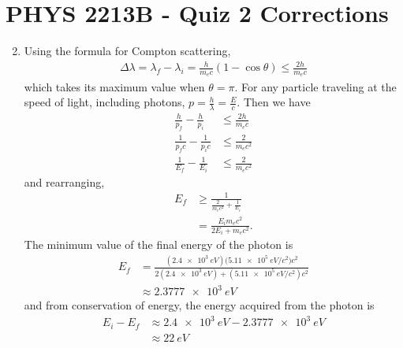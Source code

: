 \documentclass[a4paper,12pt]{article}
\begin{document}
\section*{PHYS 2213B - Quiz 2 Corrections}

\begin{enumerate}
    \setcounter{enumi}{1}
    \item
        Using the formula for Compton scattering,
        \begin{align*}
            \Delta \lambda = \lambda_f - \lambda_i = \frac{h}{m_e c}(1 - \cos\theta) \leq \frac{2h}{m_e c}
        \end{align*}
        which takes its maximum value when $\theta = \pi$. For any particle traveling at the speed of light, including photons, $p = \frac{h}{\lambda} = \frac{E}{c}$. Then we have
        \begin{align*}
            \frac{h}{p_f} - \frac{h}{p_i} &\leq \frac{2h}{m_e c} \\
            \frac{1}{p_f c} - \frac{1}{p_i c} &\leq \frac{2}{m_e c^2} \\
            \frac{1}{E_f} - \frac{1}{E_i} &\leq \frac{2}{m_e c^2}
        \end{align*}
        and rearranging,
        \begin{align*}
            E_f &\geq \frac{1}{\frac{2}{m_e c^2} + \frac{1}{E_i}} \\
            &= \frac{E_i m_e c^2}{2E_i + m_e c^2}.
        \end{align*}
        The minimum value of the final energy of the photon is
        \begin{align*}
            E_f &= \frac{(\SI{2.4e3}{eV}) (\SI{5.11e5}{eV/c^2)} c^2}{2(\SI{2.4e3}{eV}) + (\SI{5.11e5}{eV/c^2}) c^2} \\
            &\approx \SI{2.3777e3}{eV}
        \end{align*}
        and from conservation of energy, the energy acquired from the photon is
        \begin{align*}
            E_i - E_f &\approx \SI{2.4e3}{eV} - \SI{2.3777e3}{eV} \\
            &\approx \SI{22}{eV}
        \end{align*}


\end{enumerate}
\end{document}
